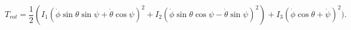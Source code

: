 \documentclass[a4paper,12pt]{report}
\begin{document}
\begin{equation}
	T_{rot} = \frac{1}{2} (I_1(\dot{\phi } \sin \theta \sin \psi + \dot{\theta } \cos \psi )^2 + I_2(\dot{\phi } \sin \theta \cos \psi -\dot{\theta } \sin \psi )^2) + I_3(\dot{\phi } \cos \theta + \dot{\psi } )^2).
\end{equation}
\end{document}
